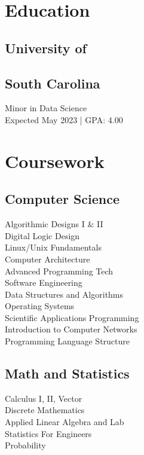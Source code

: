 \documentclass[letterpaper]{deedy-resume}
\begin{document}
\begin{minipage}[t]{0.29\textwidth} 

\section{Education} 

\subsection{University of}
\subsection{South Carolina}


Minor in Data Science \\
Expected May 2023 | GPA: 4.00 \\

\sectionspace 

\section{Coursework}

\subsection{Computer Science}
Algorithmic Designs I \& II \\
Digital Logic Design \\
Linux/Unix Fundamentals \\
Computer Architecture \\
Advanced Programming Tech \\
Software Engineering \\
Data Structures and Algorithms \\
Operating Systems \\
Scientific Applications Programming \\
Introduction to Computer Networks \\
Programming Language Structure \\

\sectionspace
\subsection{Math and Statistics}
Calculus I, II, Vector \\
Discrete Mathematics \\
Applied Linear Algebra and Lab \\
Statistics For Engineers \\
Probability \\
\sectionspace


\end{minipage}
\end{document}

